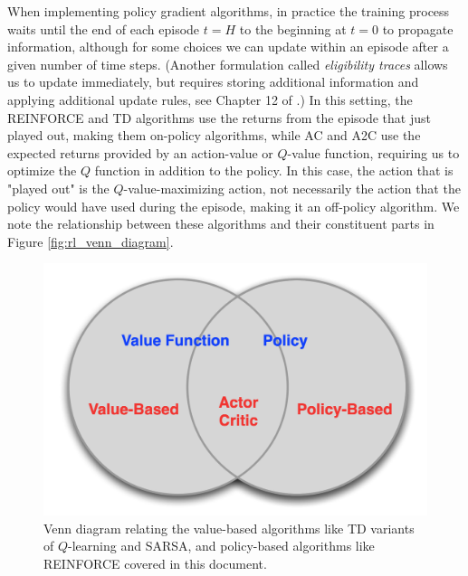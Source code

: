 \documentclass{article}
\begin{document}
When implementing policy gradient algorithms, in practice the training process waits until the end of each episode $t=H$ to the beginning at $t=0$ to propagate information, although for some choices we can update within an episode after a given number of time steps. (Another formulation called \textit{eligibility traces} allows us to update immediately, but requires storing additional information and applying additional update rules, see Chapter 12 of \cite{sutton_barto_rl}.) In this setting, the REINFORCE and TD algorithms use the returns from the episode that just played out, making them on-policy algorithms, while AC and A2C use the expected returns provided by an action-value or $Q$-value function, requiring us to optimize the $Q$ function in addition to the policy. In this case, the action that is "played out" is the $Q$-value-maximizing action, not necessarily the action that the policy would have used during the episode, making it an off-policy algorithm.  We note the relationship between these algorithms and their constituent parts in Figure \ref{fig:rl_venn_diagram}.

\begin{figure}
\label{fig:rl_venn_diagram}
    \begin{center}
    \includegraphics[width=0.75\linewidth]{rl_venn_diagram}
    \caption{Venn diagram relating the value-based algorithms like TD variants of $Q$-learning and SARSA, and policy-based algorithms like REINFORCE covered in this document. \footnotemark}
    \label{fig:basis_small_width}
    \end{center}
\end{figure}
\end{document}
